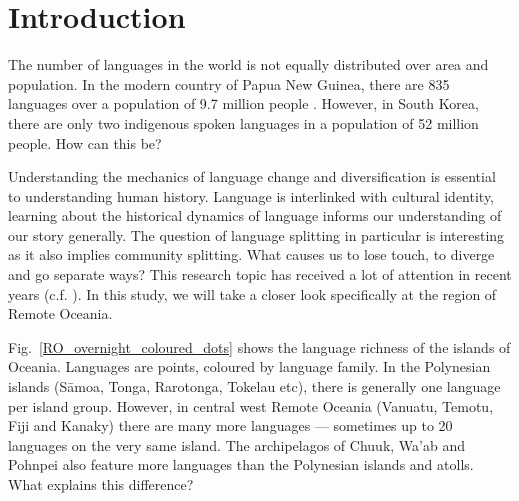 \documentclass[unnumsec,webpdf,modern,medium]{oup-authoring-template}
\begin{document}



\maketitle

\newpage



\onecolumn
\section{Introduction}
\doublespacing

The number of languages in the world is not equally distributed over area and population. In the modern country of Papua New Guinea, there are 835 languages over a population of 9.7 million people \citep{UN_pop, glottolog4_5}. However, in South Korea, there are only two indigenous spoken languages in a population of 52 million people. How can this be?

Understanding the mechanics of language change and diversification is essential to understanding human history. Language is interlinked with cultural identity, learning about the historical dynamics of language informs our understanding of our story generally. The question of language splitting in particular is interesting as it also implies community splitting. What causes us to lose touch, to diverge and go separate ways? This research topic has received a lot of attention in recent years (c.f. \citet{gavin2017process,  greenhill2015demographic, Pacheco_Coelho_2019, hua2019ecological}). In this study, we will take a closer look specifically at the region of Remote Oceania. 

Fig.~\ref{RO_overnight_coloured_dots} shows the language richness of the islands of Oceania. Languages are points, coloured by language family. In the Polynesian islands (S\={a}moa, Tonga, Rarotonga, Tokelau etc), there is generally one language per island group. However, in central west Remote Oceania (Vanuatu, Temotu, Fiji and Kanaky) there are many more languages --- sometimes up to 20 languages on the very same island. The archipelagos of Chuuk, Wa'ab and Pohnpei also feature more languages than the Polynesian islands and atolls. What explains this difference?
\end{document}
